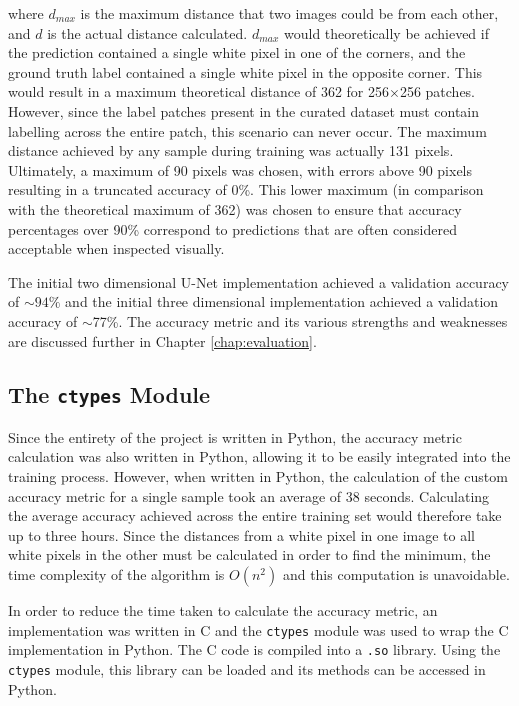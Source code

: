 where $d_{max}$ is the maximum distance that two images could be from each other, and $d$ is the actual distance calculated. $d_{max}$ would theoretically be achieved if the prediction contained a single white pixel in one of the corners, and the ground truth label contained a single white pixel in the opposite corner. This would result in a maximum theoretical distance of 362 for 256$\times$256 patches. However, since the label patches present in the curated dataset must contain labelling across the entire patch, this scenario can never occur. The maximum distance achieved by any sample during training was actually 131 pixels. Ultimately, a maximum of 90 pixels was chosen, with errors above 90 pixels resulting in a truncated accuracy of 0\%. This lower maximum (in comparison with the theoretical maximum of 362) was chosen to ensure that accuracy percentages over 90\% correspond to predictions that are often considered acceptable when inspected visually.

The initial two dimensional U-Net implementation achieved a validation accuracy of ${\sim}94\%$ and the initial three dimensional implementation achieved a validation accuracy of ${\sim}$77\%. The accuracy metric and its various strengths and weaknesses are discussed further in Chapter \ref{chap:evaluation}.

\subsection{The \texttt{ctypes} Module}

Since the entirety of the project is written in Python, the accuracy metric calculation was also written in Python, allowing it to be easily integrated into the training process. However, when written in Python, the calculation of the custom accuracy metric for a single sample took an average of 38 seconds. Calculating the average accuracy achieved across the entire training set would therefore take up to three hours. Since the distances from a white pixel in one image to all white pixels in the other must be calculated in order to find the minimum, the time complexity of the algorithm is $O(n^2)$ and this computation is unavoidable.

In order to reduce the time taken to calculate the accuracy metric, an implementation was written in C and the \texttt{ctypes} module was used to wrap the C implementation in Python. The C code is compiled into a \texttt{.so} library. Using the \texttt{ctypes} module, this library can be loaded and its methods can be accessed in Python. 


